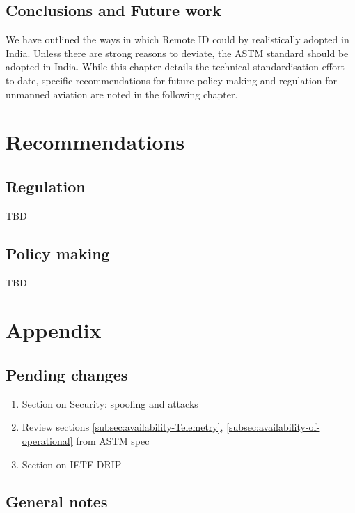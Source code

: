 \documentclass{ua_wgs_base}
\begin{document}
\section{Conclusions and Future work}

We have outlined the ways in which Remote ID could by realistically
adopted in India. Unless there are strong reasons to deviate, the
ASTM standard should be adopted in India. While this chapter details
the technical standardisation effort to date, specific recommendations
for future policy making and regulation for unmanned aviation are
noted in the following chapter.

\cleardoublepage{}

\chapter{Recommendations}

\section{Regulation}

TBD

\section{Policy making}

TBD

\cleardoublepage{}

\chapter{Appendix}

\section{Pending changes}
\begin{enumerate}
\item Section on Security: spoofing and attacks
\item Review sections \ref{subsec:availability-Telemetry}, \ref{subsec:availability-of-operational}
from ASTM spec
\item Section on IETF DRIP
\end{enumerate}

\section{General notes}
\end{document}
